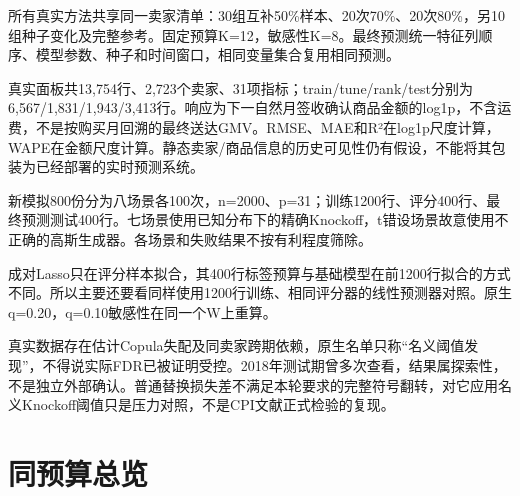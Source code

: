 \documentclass[UTF8,11pt,a4paper]{ctexart}
\begin{document}
所有真实方法共享同一卖家清单：30组互补50\%样本、20次70\%、20次80\%，另10组种子变化及完整参考。固定预算K=12，敏感性K=8。最终预测统一特征列顺序、模型参数、种子和时间窗口，相同变量集合复用相同预测。

真实面板共13,754行、2,723个卖家、31项指标；train/tune/rank/test分别为6,567/1,831/1,943/3,413行。响应为下一自然月签收确认商品金额的log1p，不含运费，不是按购买月回溯的最终送达GMV。RMSE、MAE和R²在log1p尺度计算，WAPE在金额尺度计算。静态卖家/商品信息的历史可见性仍有假设，不能将其包装为已经部署的实时预测系统。

新模拟800份分为八场景各100次，n=2000、p=31；训练1200行、评分400行、最终预测测试400行。七场景使用已知分布下的精确Knockoff，t错设场景故意使用不正确的高斯生成器。各场景和失败结果不按有利程度筛除。

成对Lasso只在评分样本拟合，其400行标签预算与基础模型在前1200行拟合的方式不同。所以主要还要看同样使用1200行训练、相同评分器的线性预测器对照。原生q=0.20，q=0.10敏感性在同一个W上重算。

真实数据存在估计Copula失配及同卖家跨期依赖，原生名单只称``名义阈值发现''，不得说实际FDR已被证明受控。2018年测试期曾多次查看，结果属探索性，不是独立外部确认。普通替换损失差不满足本轮要求的完整符号翻转，对它应用名义Knockoff阈值只是压力对照，不是CPI文献正式检验的复现。

\section{同预算总览}\label{ux540cux9884ux7b97ux603bux89c8}
\end{document}
